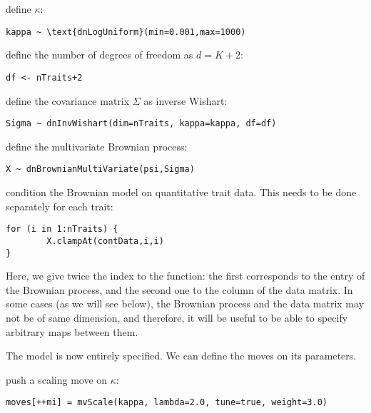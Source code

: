 define $\kappa$:
{\tt \small \begin{snugshade*}
\begin{lstlisting}
kappa ~ \text{dnLogUniform}(min=0.001,max=1000)
\end{lstlisting}
\end{snugshade*}}
define the number of degrees of freedom as $d = K+2$:
{\tt \small \begin{snugshade*}
\begin{lstlisting}
df <- nTraits+2
\end{lstlisting}
\end{snugshade*}}
define the covariance matrix $\Sigma$ as inverse Wishart:
{\tt \small \begin{snugshade*}
\begin{lstlisting}
Sigma ~ dnInvWishart(dim=nTraits, kappa=kappa, df=df)
\end{lstlisting}
\end{snugshade*}}
define the multivariate Brownian process:
{\tt \small \begin{snugshade*}
\begin{lstlisting}
X ~ dnBrownianMultiVariate(psi,Sigma)
\end{lstlisting}
\end{snugshade*}}
condition the Brownian model on quantitative trait data.
This needs to be done separately for each trait:
{\tt \small \begin{snugshade*}
\begin{lstlisting}
for (i in 1:nTraits) {
        X.clampAt(contData,i,i)
}
\end{lstlisting}
\end{snugshade*}}
Here, we give twice the index  to the  function: the first corresponds to the entry of the Brownian process, and the second one to the column of the data matrix. In some cases (as we will see below), the Brownian process and the data matrix may not be of same dimension, and therefore, it will be useful to be able to specify arbitrary maps between them.


The model is now entirely specified. We can define the moves on its parameters.

push a scaling move on $\kappa$:
{\tt \small \begin{snugshade*}
\begin{lstlisting}
moves[++mi] = mvScale(kappa, lambda=2.0, tune=true, weight=3.0)
\end{lstlisting}
\end{snugshade*}}

